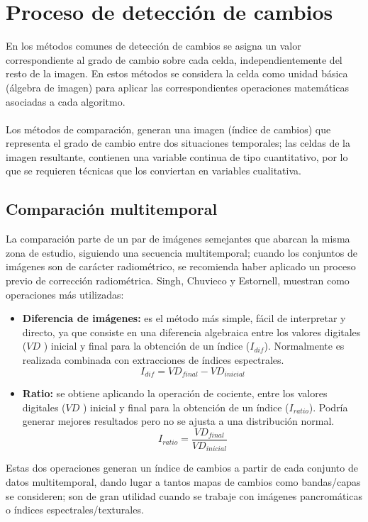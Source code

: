 \section{Proceso de detecci\'on de cambios}
En los m\'etodos comunes de detecci\'on de cambios se asigna un valor correspondiente al grado de cambio sobre cada celda, independientemente del resto de la imagen. En estos m\'etodos se considera la celda como unidad b\'asica (\'algebra de imagen) para aplicar las correspondientes operaciones matem\'aticas asociadas a cada algoritmo.\\~\\
Los m\'etodos de comparaci\'on, generan una imagen (\'indice de cambios) que representa el grado de cambio entre dos situaciones temporales; las celdas de la imagen resultante, contienen una variable continua de tipo cuantitativo, por lo que se requieren t\'ecnicas que los conviertan en variables cualitativa\cite{martinez2013normalizacion}.
\subsection{Comparaci\'on multitemporal}\label{subsec:compMult}
La comparaci\'on parte de un par de im\'agenes semejantes que abarcan la misma zona de estudio, siguiendo una secuencia multitemporal; cuando los conjuntos de im\'agenes son de car\'acter radiom\'etrico, se recomienda haber aplicado un proceso previo de correcci\'on radiom\'etrica. Singh\cite{singh1989review}, Chuvieco\cite{chuvieco1998factor} y Estornell\cite{estornell2004analisis}, muestran como operaciones más utilizadas:
	\begin{itemize}
		\item \textbf{Diferencia de im\'agenes:} es el m\'etodo m\'as simple, f\'acil de interpretar y directo, ya que consiste en una diferencia algebraica entre los valores digitales ($ VD $ ) inicial y final para la obtenci\'on de un \'indice ($ I_{dif} $). Normalmente es realizada combinada  con extracciones de \'indices espectrales.
								\begin{equation}
								I_{dif} = VD_{final}-VD_{inicial}
								\end{equation} 	
				\item \textbf{Ratio:} se obtiene aplicando la operación de cociente, entre los valores digitales ($ VD $ ) inicial y final para la obtenci\'on de un \'indice ($ I_{ratio} $). Podr\'ia  generar mejores resultados pero no se ajusta a una distribución normal.
										\begin{equation}
										I_{ratio} = \dfrac{VD_{final}}{VD_{inicial}}
										\end{equation} 	

		\end{itemize}
Estas dos operaciones generan un \'indice de cambios a partir de cada conjunto de datos multitemporal, dando lugar a tantos mapas de cambios como bandas/capas se consideren; son de gran utilidad cuando se trabaje con im\'agenes pancrom\'aticas o \'indices espectrales/texturales.

